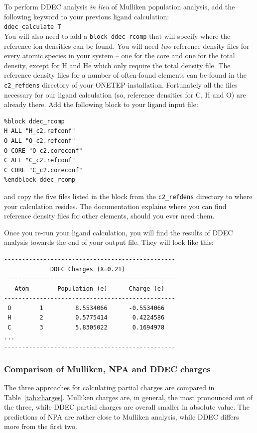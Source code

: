\documentclass{article}
\begin{document}
To perform DDEC analysis \textit{in lieu} of Mulliken population analysis, add the following keyword to your previous ligand calculation:\\

\noindent
\texttt{ddec\_calculate T}\\

\noindent
You will also need to add a \texttt{block ddec\_rcomp} that will specify where the reference ion densities can be found. You will need \textit{two} reference density files for every atomic species in your system -- one for the core and one for the total density, except for H and He which only require the total density file. The reference density files for a number of often-found elements can be found in the \texttt{c2\_refdens} directory of your ONETEP installation. Fortunately all the files necessary for our ligand calculation (so, reference densities for C, H and O) are already there. Add the following block to your ligand input file:

\noindent
\begin{verbatim}
%block ddec_rcomp
H ALL "H_c2.refconf"
O ALL "O_c2.refconf"
O CORE "O_c2.coreconf"
C ALL "C_c2.refconf"
C CORE "C_c2.coreconf"
%endblock ddec_rcomp
\end{verbatim}
\noindent
and copy the five files listed in the block from the \texttt{c2\_refdens} directory to where your calculation resides. The documentation explains where you can find reference density files for other elements, should you ever need them.

Once you re-run your ligand calculation, you will find the results of DDEC analysis towards the end of your output file. They will look like this:

\begin{verbatim}
------------------------------------------------
             DDEC Charges (X=0.21)              
------------------------------------------------
   Atom        Population (e)      Charge (e)   
------------------------------------------------
 O        1         8.5534066      -0.5534066
 H        2         0.5775414       0.4224586
 C        3         5.8305022       0.1694978
...
------------------------------------------------
\end{verbatim}

\subsubsection{Comparison of Mulliken, NPA and DDEC charges}
The three approaches for calculating partial charges are compared in Table~\ref{tab:charges}. Mulliken charges are, in general, the most pronounced out of the three, while DDEC partial charges are overall smaller in absolute value. The predictions of NPA are rather close to Mulliken analysis, while DDEC differs more from the first two.
\end{document}
